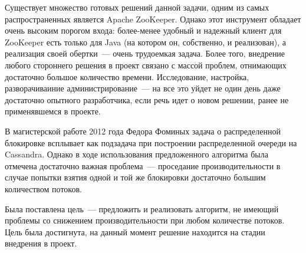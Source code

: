Существует множество готовых решений данной задачи, одним из самых распространенных является Apache ZooKeeper. Однако этот инструмент обладает очень высоким порогом входа: более-менее удобный и надежный клиент для ZooKeeper есть только для Java (на котором он, собственно, и реализован), а реализация своей обертки~--- очень трудоемкая задача. Более того, внедрение любого стороннего решения в проект связано с массой проблем, отнимающих достаточно большое количество времени. Исследование, настройка, разворачиваиние администрирование~--- на все это уйдет не один день даже достаточно опытного разработчика, если речь идет о новом решении, ранее не применявшемся в проекте.

В магистерской работе 2012 года Федора Фоминых задача о распределенной блокировке всплывает как подзадача при построении распределенной очереди на Cassandra. Однако в ходе использования предложенного алгоритма была отмечена достаточно важная проблема~--- проседание производительности в случае попытки взятия одной и той же блокировки достаточно большим количеством потоков.

Была поставлена цель~--- предложить и реализовать алгоритм, не имеющий проблемы со снижением производительности при любом количестве потоков. Цель была достигнута, на данный момент решение находится на стадии внедрения в проект.